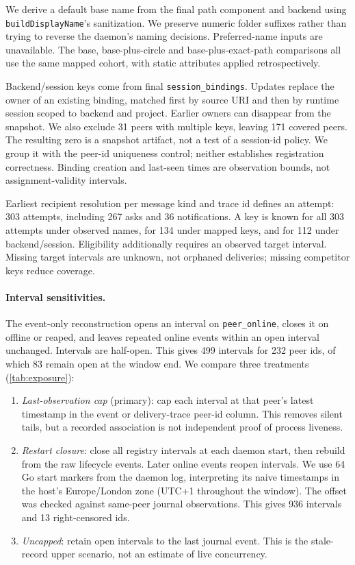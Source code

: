 \documentclass[10pt,twocolumn]{article}
\newcommand{\code}[1]{\texttt{#1}}
\begin{document}
We derive a default base name from the final path component and backend using \code{buildDisplayName}'s sanitization. We preserve numeric folder suffixes rather than trying to reverse the daemon's naming decisions. Preferred-name inputs are unavailable. The base, base-plus-circle and base-plus-exact-path comparisons all use the same mapped cohort, with static attributes applied retrospectively.

Backend/session keys come from final \code{session\_bindings}. Updates replace the owner of an existing binding, matched first by source URI and then by runtime session scoped to backend and project. Earlier owners can disappear from the snapshot. We also exclude 31 peers with multiple keys, leaving 171 covered peers. The resulting zero is a snapshot artifact, not a test of a session-id policy. We group it with the peer-id uniqueness control; neither establishes registration correctness. Binding creation and last-seen times are observation bounds, not assignment-validity intervals.

Earliest recipient resolution per message kind and trace id defines an attempt: 303 attempts, including 267 asks and 36 notifications. A key is known for all 303 attempts under observed names, for 134 under mapped keys, and for 112 under backend/session. Eligibility additionally requires an observed target interval. Missing target intervals are unknown, not orphaned deliveries; missing competitor keys reduce coverage.

\paragraph{Interval sensitivities.}
The event-only reconstruction opens an interval on \code{peer\_online}, closes it on offline or reaped, and leaves repeated online events within an open interval unchanged. Intervals are half-open. This gives 499 intervals for 232 peer ids, of which 83 remain open at the window end. We compare three treatments (\cref{tab:exposure}):
\begin{enumerate}
\item \emph{Last-observation cap} (primary): cap each interval at that peer's latest timestamp in the event or delivery-trace peer-id column. This removes silent tails, but a recorded association is not independent proof of process liveness.
\item \emph{Restart closure}: close all registry intervals at each daemon start, then rebuild from the raw lifecycle events. Later online events reopen intervals. We use 64 Go start markers from the daemon log, interpreting its naive timestamps in the host's Europe/London zone (UTC+1 throughout the window). The offset was checked against same-peer journal observations. This gives 936 intervals and 13 right-censored ids.
\item \emph{Uncapped}: retain open intervals to the last journal event. This is the stale-record upper scenario, not an estimate of live concurrency.
\end{enumerate}
\end{document}
